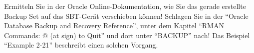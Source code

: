     \item Ermitteln Sie in der Oracle Online-Dokumentation, wie Sie das gerade
    erstellte Backup Set auf das SBT-Ger\"at verschieben k\"onnen! Schlagen Sie
    in der \enquote{Oracle Database Backup and Recovery Reference}, unter dem
    Kapitel \enquote{RMAN Commands: @ (at sign) to Quit} und dort unter
    \enquote{BACKUP} nach! Das Beispiel \enquote{Example 2-21} beschreibt einen
    solchen Vorgang.
